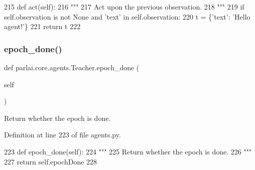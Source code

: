 \begin{DoxyCode}
215     \textcolor{keyword}{def }act(self):
216         \textcolor{stringliteral}{"""}
217 \textcolor{stringliteral}{        Act upon the previous observation.}
218 \textcolor{stringliteral}{        """}
219         \textcolor{keywordflow}{if} self.observation \textcolor{keywordflow}{is} \textcolor{keywordflow}{not} \textcolor{keywordtype}{None} \textcolor{keywordflow}{and} \textcolor{stringliteral}{'text'} \textcolor{keywordflow}{in} self.observation:
220             t = \{\textcolor{stringliteral}{'text'}: \textcolor{stringliteral}{'Hello agent!'}\}
221         \textcolor{keywordflow}{return} t
222 
\end{DoxyCode}
\mbox{\label{classparlai_1_1core_1_1agents_1_1Teacher_a4a2eda53b7b26f114ae3149b60f57845}} 
\subsubsection{\texorpdfstring{epoch\+\_\+done()}{epoch\_done()}}
{\footnotesize\ttfamily def parlai.\+core.\+agents.\+Teacher.\+epoch\+\_\+done (\begin{DoxyParamCaption}\item[{}]{self }\end{DoxyParamCaption})}

\begin{DoxyVerb}Return whether the epoch is done.
\end{DoxyVerb}
 

Definition at line 223 of file agents.\+py.


\begin{DoxyCode}
223     \textcolor{keyword}{def }epoch\_done(self):
224         \textcolor{stringliteral}{"""}
225 \textcolor{stringliteral}{        Return whether the epoch is done.}
226 \textcolor{stringliteral}{        """}
227         \textcolor{keywordflow}{return} self.epochDone
228 
\end{DoxyCode}
\mbox{\label{classparlai_1_1core_1_1agents_1_1Teacher_aa35e171610f8dd8e6a2fd5a87ad91e10}} 

